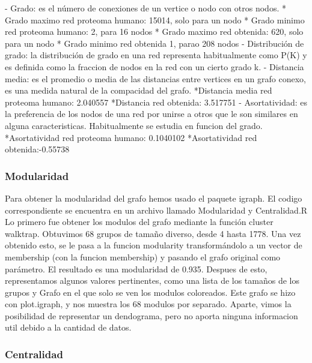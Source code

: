 - Grado: es el número de conexiones de un vertice o nodo con otros nodos. 
  * Grado maximo red proteoma humano: 15014, solo para un nodo
  * Grado minimo red proteoma humano: 2, para 16 nodos
  * Grado maximo red obtenida: 620, solo para un nodo
  * Grado minimo red obtenida 1, parao 208 nodos
- Distribución de grado: la distribución de grado en una red representa habitualmente como P(K) y es definida como la fraccion de nodos en la red con un cierto grado k. 
- Distancia media: es el promedio o media de las distancias entre vertices en un grafo conexo, es una medida natural de la compacidad del grafo. 
  *Distancia media red proteoma humano: 2.040557
  *Distancia red obtenida: 3.517751
- Asortatividad: es la preferencia de los nodos de una red por unirse a otros que le son similares en alguna caracteristicas. Habitualmente se estudia en funcion del grado.
  *Asortatividad red proteoma humano: 0.1040102
  *Asortatividad red obtenida:-0.55738

\subsubsection{Modularidad}

Para obtener la modularidad del grafo hemos usado el paquete igraph. El codigo correspondiente se encuentra en un archivo llamado Modularidad y Centralidad.R
Lo primero fue obtener los modulos del grafo mediante la función cluster walktrap. Obtuvimos 68 grupos de tamaño diverso, desde 4 hasta 1778. Una vez obtenido esto, se le pasa a la funcion modularity transformándolo a un vector de membership (con la funcion membership) y pasando el grafo original como parámetro. El resultado es una modularidad de 0.935.
Despues de esto, representamos algunos valores pertinentes, como una lista de los tamaños de los grupos y Grafo en el que solo se ven los modulos coloreados.
Este grafo se hizo con plot.igraph, y nos muestra los 68 modulos por separado.
Aparte, vimos la posibilidad de representar un dendograma, pero no aporta ninguna informacion util debido a la cantidad de datos.


\subsubsection{Centralidad}

